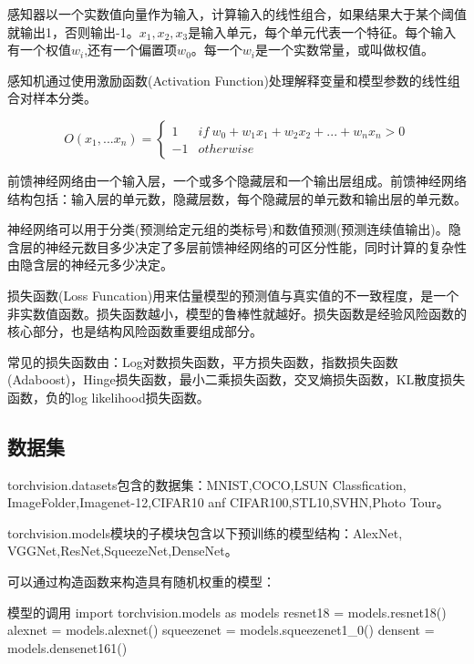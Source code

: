 \documentclass[openbib]{article}
\begin{document}
感知器以一个实数值向量作为输入，计算输入的线性组合，如果结果大于某个阈值就输出1，否则输出-1。$x_1,x_2,x_3$是输入单元，每个单元代表一个特征。每个输入有一个权值$w_i$,还有一个偏置项$w_0$。每一个$w_i$是一个实数常量，或叫做权值。

感知机通过使用激励函数(Activation Function)处理解释变量和模型参数的线性组合对样本分类。

\begin{equation*}
	O(x_1,...x_n) = \left\{ \begin{array}{cl}
		1 & if \ w_0+w_1x_1+w_2x_2+...+w_nx_n >0 \\
		-1 & otherwise
	\end{array} \right.
\end{equation*}


前馈神经网络由一个输入层，一个或多个隐藏层和一个输出层组成。前馈神经网络结构包括：输入层的单元数，隐藏层数，每个隐藏层的单元数和输出层的单元数。

神经网络可以用于分类(预测给定元组的类标号)和数值预测(预测连续值输出)。隐含层的神经元数目多少决定了多层前馈神经网络的可区分性能，同时计算的复杂性由隐含层的神经元多少决定。

损失函数(Loss Funcation)用来估量模型的预测值与真实值的不一致程度，是一个非实数值函数。损失函数越小，模型的鲁棒性就越好。损失函数是经验风险函数的核心部分，也是结构风险函数重要组成部分。

常见的损失函数由：Log对数损失函数，平方损失函数，指数损失函数(Adaboost)，Hinge损失函数，最小二乘损失函数，交叉熵损失函数，KL散度损失函数，负的log likelihood损失函数。



\subsection{数据集}

torchvision.datasets包含的数据集：MNIST,COCO,LSUN Classfication,\\ ImageFolder,Imagenet-12,CIFAR10 anf CIFAR100,STL10,SVHN,Photo Tour。

torchvision.models模块的子模块包含以下预训练的模型结构：AlexNet,\\ VGGNet,ResNet,SqueezeNet,DenseNet。

可以通过构造函数来构造具有随机权重的模型：
\begin{Python}{模型的调用}
	import torchvision.models as models
	resnet18 = models.resnet18()
	alexnet = models.alexnet()
	squeezenet = models.squeezenet1_0()
	densent = models.densenet161()
\end{Python}
\end{document}
